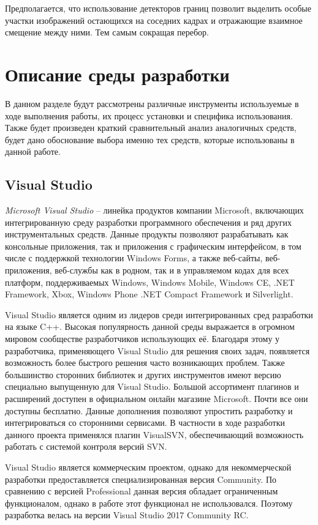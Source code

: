 Предполагается, что использование детекторов границ позволит выделить особые участки изображений остающихся на соседних кадрах и отражающие взаимное смещение между ними. Тем самым сокращая перебор.  

\section{Описание среды разработки}
\label{sec:env_description}
В данном разделе будут рассмотрены различные инструменты используемые в ходе выполнения работы, их процесс установки и специфика использования. Также будет произведен краткий сравнительный анализ аналогичных средств, будет дано обоснование выбора именно тех средств, которые использованы в данной работе. 
\subsection{Visual Studio}
\label{sub:env_description:vs}
\textit{Microsoft Visual Studio} -- линейка продуктов компании Microsoft, включающих интегрированную среду разработки программного обеспечения и ряд других инструментальных средств. Данные продукты позволяют разрабатывать как консольные приложения, так и приложения с графическим интерфейсом, в том числе с поддержкой технологии Windows Forms, а также веб-сайты, веб-приложения, веб-службы как в родном, так и в управляемом кодах для всех платформ, поддерживаемых Windows, Windows Mobile, Windows CE, .NET Framework, Xbox, Windows Phone .NET Compact Framework и Silverlight.

Visual Studio является одним из лидеров среди интегрированных сред разработки на языке C++. Высокая популярность данной среды выражается в огромном мировом сообществе разработчиков использующих её. Благодаря этому у разработчика, применяющего Visual Studio для решения своих задач, появляется возможность более быстрого решения часто возникающих проблем. Также большинство сторонних библиотек и других инструментов имеют версию специально выпущенную для Visual Studio. Большой ассортимент плагинов и расширений доступен в официальном онлайн магазине Microsoft. Почти все они доступны бесплатно. Данные дополнения позволяют упростить разработку и интегрироваться со сторонними сервисами. В частности в ходе разработки данного проекта применялся плагин VisualSVN, обеспечивающий возможность работать с системой контроля версий SVN.

Visual Studio является коммерческим проектом, однако для некоммерческой разработки предоставляется специализированная версия Community. По сравнению с версией Professional данная версия обладает ограниченным функционалом, однако в работе этот функционал не использовался. Поэтому разработка велась на версии Visual Studio 2017 Community RC.

